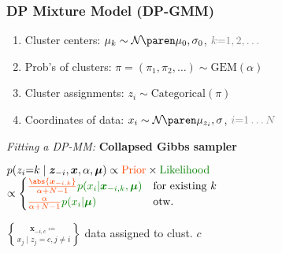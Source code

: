 \subsubsection{DP Mixture Model (DP-GMM)}
\begin{enumerate}
    \item Cluster centers:\enskip
        $\mu_k \sim \Gauss{\mu_0, \sigma_0}$,\enskip
        $\color{gray} k {=} 1, 2, \ldots$
    \item Prob's of clusters:\enskip
        $\pi = (\pi_1, \pi_2, \ldots) \sim \mathrm{GEM}(\alpha)$
    \item Cluster assignments:\enskip
        $z_i \sim \mathrm{Categorical}(\pi)$
    \item Coordinates of data:\enskip
        $x_i \sim \Gauss{\mu_{z_i}, \sigma}$,\enskip
        $\color{gray} i {=} 1 \ldots N$
\end{enumerate}

\emph{Fitting a DP-MM:}\enskip
\textbf{Collapsed Gibbs sampler}

$p(z_i {=} k \mid \bm z_{-i}, \bm x, \alpha, \bm\mu) \propto
\begingroup \color{OrangeRed} \text{Prior} \endgroup \times
\begingroup \color{Green} \text{Likelihood} \endgroup$
\\\hfill
$\propto \begin{cases}
    \begingroup \color{OrangeRed}
        \frac{\abs{\bm x_{-i,k}}}{\alpha+N-1}
    \endgroup
    \begingroup \color{Green}
        p(x_i \vert \bm x_{-i, k}, \bm\mu)
    \endgroup
    & \text{for existing } k
    \\
    \begingroup \color{OrangeRed}
        \frac{\alpha}{\alpha+N-1}
    \endgroup
    \begingroup \color{Green}
        p(x_i\vert \bm\mu)
    \endgroup
    & \text{otw.}
\end{cases}$

$\bm x_{-i,c} \coloneqq \brace{ x_j \mid z_j {=} c, j {\neq} i }$ data assigned to clust. $c$



